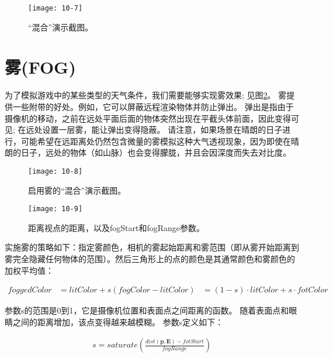 \begin{figure}[h]
    \texttt{[image: 10-7]}
    \centering
    \caption{“混合”演示截图。}
    \label{fig:10-7}
\end{figure}

\section{雾(FOG)}
\begin{flushleft}
为了模拟游戏中的某些类型的天气条件，我们需要能够实现雾效果; 见图\ref{fig:10-8}。 雾提供一些附带的好处。例如，它可以屏蔽远程渲染物体并防止弹出。 弹出是指由于摄像机的移动，之前在远处平面后面的物体突然出现在平截头体前面，因此变得可见; 在远处设置一层雾，能让弹出变得隐蔽。 请注意，如果场景在晴朗的日子进行，可能希望在远距离处仍然包含微量的雾模拟这种大气透视现象，因为即使在晴朗的日子，远处的物体（如山脉）也会变得朦胧，并且会因深度而失去对比度。\\
\end{flushleft}

\begin{figure}[h]
    \texttt{[image: 10-8]}
    \centering
    \caption{启用雾的“混合”演示截图。}
    \label{fig:10-8}
\end{figure}

\begin{figure}[h]
    \texttt{[image: 10-9]}
    \centering
    \caption{距离视点的距离，以及fogStart和fogRange参数。}
    \label{fig:10-9}
\end{figure}

\begin{flushleft}
实施雾的策略如下：指定雾颜色，相机的雾起始距离和雾范围（即从雾开始距离到雾完全隐藏任何物体的范围）。然后三角形上的点的颜色是其通常颜色和雾颜色的加权平均值：\\
\end{flushleft}

\begin{align*}
foggedColor&=litColor+s(fogColor-litColor)
&=(1-s)\cdot litColor+s\cdot fotColor
\end{align*}

\begin{flushleft}
参数s的范围是0到1，它是摄像机位置和表面点之间距离的函数。 随着表面点和眼睛之间的距离增加，该点变得越来越模糊。 参数s定义如下：\\
\end{flushleft}

\begin{align*}
s=saturate\left ( \frac{dist(\boldsymbol{p},\boldsymbol{E})-fotStart}{fogRange}\right )
\end{align*}

